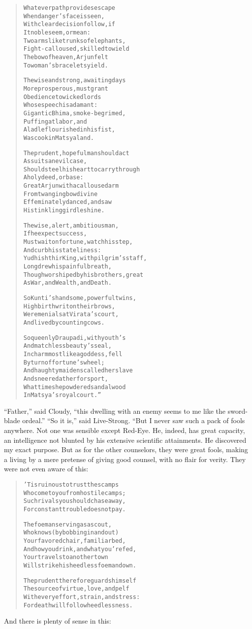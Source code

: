 \documentclass[article, twoside, 14pt]{memoir}
\renewenvironment{verbatim}{%
\begin{quote}%
\vskip -10pt%
\begin{alltt}\normalfont\large}{\end{alltt}%
\end{quote}%
\vskip -10pt
} %
\begin{document}
\begin{verbatim}
Whatever path provides escape
    When danger's face is seen,
With clear decision follow, if
    It noble seem, or mean:
Two arms like trunks of elephants,
    Fight-calloused, skilled to wield
The bow of heaven, Arjun felt
    To woman's bracelets yield.

The wise and strong, awaiting days
    More prosperous, must grant
Obedience to wicked lords
    Whose speech is adamant:
Gigantic Bhima, smoke-begrimed,
    Puffing at labor, and
A ladle flourished in his fist,
    Was cook in Matsya land.

The prudent, hopeful man should act
    As suits an evil case,
Should steel his heart to carry through
    A holy deed, or base:
Great Arjun with a calloused arm
    From twanging bow divine
Effeminately danced, and saw
    His tinkling girdle shine.

The wise, alert, ambitious man,
    If he expect success,
Must wait on fortune, watch his step,
    And curb his stateliness:
Yudhishthir King, with pilgrim's staff,
    Long drew his painful breath,
Though worshiped by his brothers, great
    As War, and Wealth, and Death.

So Kunti's handsome, powerful twins,
    High birth writ on their brows,
Were menials at Virata's court,
    And lived by counting cows.

So queenly Draupadi, with youth's
    And matchless beauty's seal,
In charm most like a goddess, fell
    By turn of fortune's wheel;
And haughty maidens called her slave
    And sneered at her for sport,
What time she powdered sandalwood
    In Matsya's royal court.”
\end{verbatim}
``Father,'' said Cloudy,
``this dwelling with an enemy seems to me like the sword-blade ordeal.''
``So it is,'' said Live-Strong. “But I never saw such a pack of
fools anywhere. Not one was sensible except Red-Eye. He,
indeed, has great capacity, an intelligence not blunted by his
extensive scientific attainments. He discovered my exact purpose.
But as for the other counselors, they were great fools, making a
living by a mere pretense of giving good counsel, with no flair for
verity. They were not even aware of this:

\begin{verbatim}
'Tis ruinous to trust the scamps
Who come to you from hostile camps;
Such rivals you should chase away,
For constant trouble does not pay.

The foeman serving as a scout,
Who knows (by bobbing in and out)
Your favored chair, familiar bed,
And how you drink, and what you're fed,
Your travels to another town{\textemdash}
Will strike his heedless foeman down.

The prudent therefore guards himself{\textemdash}
The source of virtue, love, and pelf{\textemdash}
With every effort, strain, and stress:
For death will follow heedlessness.
\end{verbatim}
And there is plenty of sense in this:
\end{document}

